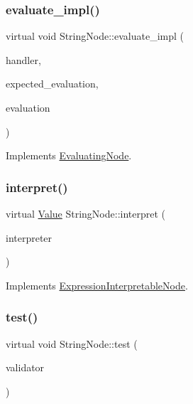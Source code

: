 \subsubsection{\texorpdfstring{evaluate\+\_\+impl()}{evaluate\_impl()}}
{\footnotesize\ttfamily virtual void String\+Node\+::evaluate\+\_\+impl (\begin{DoxyParamCaption}\item[{\hyperlink{classSystemHandler}{System\+Handler} $\ast$}]{handler,  }\item[{\hyperlink{statics_8h_a6664c451ca7787483a7981cc1de68dbb}{E\+V\+A\+L\+U\+A\+T\+I\+O\+N\+\_\+\+T\+Y\+PE}}]{expected\+\_\+evaluation,  }\item[{struct \hyperlink{structEvaluation}{Evaluation} $\ast$}]{evaluation }\end{DoxyParamCaption})\hspace{0.3cm}{\ttfamily [virtual]}}



Implements \hyperlink{classEvaluatingNode_a085fa06e0b46a93c814dc55cda0c1b26}{Evaluating\+Node}.

\mbox{\label{classStringNode_ae92c0858cd07baf0c6417f7bdfce9f0d}} 
\subsubsection{\texorpdfstring{interpret()}{interpret()}}
{\footnotesize\ttfamily virtual \hyperlink{classValue}{Value} String\+Node\+::interpret (\begin{DoxyParamCaption}\item[{\hyperlink{classInterpreter}{Interpreter} $\ast$}]{interpreter }\end{DoxyParamCaption})\hspace{0.3cm}{\ttfamily [virtual]}}



Implements \hyperlink{classExpressionInterpretableNode_a43650f046c48fc539f77a207e3c9181e}{Expression\+Interpretable\+Node}.

\mbox{\label{classStringNode_a3836ad2a1bb6f86cd52663653a65bad8}} 
\subsubsection{\texorpdfstring{test()}{test()}}
{\footnotesize\ttfamily virtual void String\+Node\+::test (\begin{DoxyParamCaption}\item[{\hyperlink{classValidator}{Validator} $\ast$}]{validator }\end{DoxyParamCaption})\hspace{0.3cm}{\ttfamily [virtual]}}



